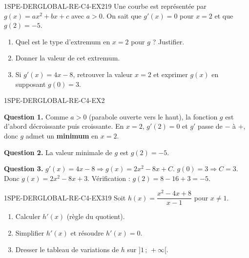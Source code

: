 
\begin{exercice}{1SPE-DERGLOBAL-RE-C4-EX2}{1}{9}
Une courbe est représentée par $g(x) = ax^2 + bx + c$ avec $a > 0$. On sait que $g'(x) = 0$ pour $x = 2$ et que $g(2) = -5$.
\begin{enumerate}
  \item Quel est le type d'extremum en $x = 2$ pour $g$ ? Justifier.
  \item Donner la valeur de cet extremum.
  \item Si $g'(x) = 4x - 8$, retrouver la valeur $x = 2$ et exprimer $g(x)$ en supposant $g(0) = 3$.
\end{enumerate}
\end{exercice}


\begin{corrige}{1SPE-DERGLOBAL-RE-C4-EX2}

\textbf{Question 1.}
Comme $a > 0$ (parabole ouverte vers le haut), la fonction $g$ est d'abord décroissante puis croissante. En $x = 2$, $g'(2) = 0$ et $g'$ passe de $-$ à $+$, donc $g$ admet un \textbf{minimum} en $x = 2$.

\textbf{Question 2.}
La valeur minimale de $g$ est $g(2) = -5$.


\textbf{Question 3.}
$g'(x) = 4x - 8 \Rightarrow g(x) = 2x^2 - 8x + C$.
$g(0) = 3 \Rightarrow C = 3$.
Donc $g(x) = 2x^2 - 8x + 3$.
Vérification : $g(2) = 8 - 16 + 3 = -5$. \checkmark

\end{corrige}


\begin{exercice}{1SPE-DERGLOBAL-RE-C4-EX3}{1}{9}
Soit $h(x) = \dfrac{x^2 - 4x + 8}{x - 1}$ pour $x
\neq 1$.
\begin{enumerate}
  \item Calculer $h'(x)$ (règle du quotient).
  \item Simplifier $h'(x)$ et résoudre $h'(x) = 0$.
  \item Dresser le tableau de variations de $h$ sur $]1\,;\,+\infty[$.
\end{enumerate}
\end{exercice}

